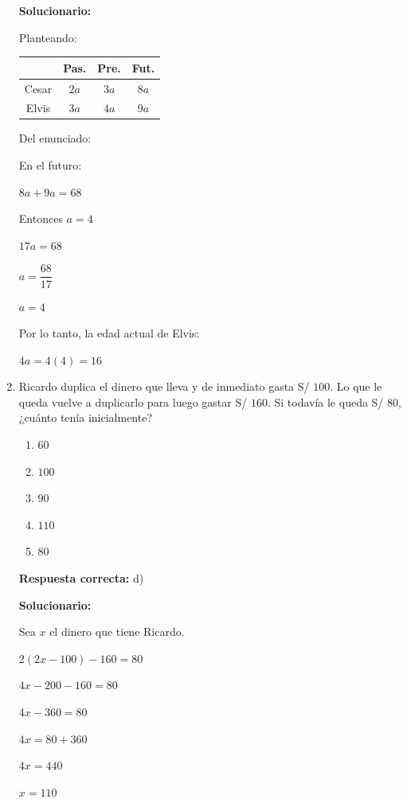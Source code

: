 \begin{enumerate}[resume]
	\vspace{2mm}
	\textbf{Solucionario:}
	
	Planteando:
	
	\begin{center}
		\begin{tabular}{c|c|c|c}
			& Pas. & Pre. & Fut. \\
			\hline
			Cesar & $2a$ & $3a$ & $8a$ \\
			Elvis & $3a$ & $4a$ & $9a$
		\end{tabular}
	\end{center}
	
	Del enunciado:
	
	En el futuro:
	
	$8a+9a=68$
	
	Entonces $a=4$
	
	$17a=68$
	
	$a=\dfrac{68}{17}$
	
	$a=4$
	
	Por lo tanto, la edad actual de Elvis:
	
	$4a=4(4)=16$
	
	
	\vspace{6mm}
	
	\item Ricardo duplica el dinero que lleva y de inmediato gasta S/ $100$. Lo que le queda vuelve a duplicarlo para luego gastar S/ $160$. Si todavía le queda S/ $80$, ¿cuánto tenía inicialmente?
	\begin{enumerate}[label=\alph*)]
		\item $60$
		\item $100$
		\item $90$
		\item $110$
		\item $80$
	\end{enumerate}
	\textbf{Respuesta correcta:} d)
	
	\vspace{2mm}
	\textbf{Solucionario:}
	
	Sea $x$ el dinero que tiene Ricardo.
	
	$2(2x-100)-160=80$
	
	$4x-200-160=80$
	
	$4x-360=80$
	
	$4x=80+360$
	
	$4x=440$
	
	$x=110$
	
	

\end{enumerate}
